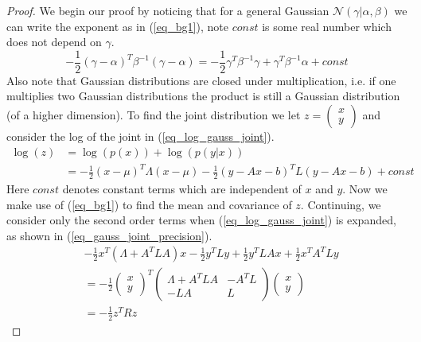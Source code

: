 \documentclass[../masters.tex]{subfiles}
\begin{document}
\begin{proof}
We begin our proof by noticing that for a general Gaussian $\mathcal{N}(\gamma|\alpha, \beta)$ we can write the exponent as in (\ref{eq_bg1}), note $const$ is some real number which does not depend on $\gamma$.
\begin{equation}
-\frac{1}{2}\left(\gamma-\alpha \right)^T\beta^{-1}\left(\gamma-\alpha \right) = -\frac{1}{2}\gamma^T\beta^{-1}\gamma +\gamma^T\beta^{-1}\alpha + const
\label{eq_bg1} 
\end{equation}
Also note that Gaussian distributions are closed under multiplication, i.e. if one multiplies two Gaussian distributions the product is still a Gaussian distribution (of a higher dimension). To find the joint distribution we let $z = \begin{pmatrix}
x \\ y
\end{pmatrix}$ and consider the log of the joint in (\ref{eq_log_gauss_joint}).
\begin{equation}
\begin{aligned}
\log(z) &= \log(p(x)) + \log(p(y|x))\\
&=  -\frac{1}{2}(x-\mu)^T\Lambda(x-\mu) -\frac{1}{2}(y-Ax-b)^T L(y-Ax-b) + const
\end{aligned}
\label{eq_log_gauss_joint}
\end{equation}
Here $const$ denotes constant terms which are independent of $x$ and $y$. Now we make use of (\ref{eq_bg1}) to find the mean and covariance of $z$. Continuing, we consider only the second order terms when (\ref{eq_log_gauss_joint}) is expanded, as shown in (\ref{eq_gauss_joint_precision}).
\begin{equation}
\begin{aligned}
&-\frac{1}{2}x^T(\Lambda+A^TLA)x-\frac{1}{2}y^TLy + \frac{1}{2}y^TLAx+\frac{1}{2}x^TA^TLy \\
&= -\frac{1}{2}\begin{pmatrix}
x \\ y
\end{pmatrix}^T \begin{pmatrix}
\Lambda+A^TLA & -A^TL \\ -LA & L
\end{pmatrix}\begin{pmatrix}
x \\ y
\end{pmatrix} \\
&= -\frac{1}{2}z^TRz
\end{aligned}
\label{eq_gauss_joint_precision}

\end{equation}
\end{proof}
\end{document}
